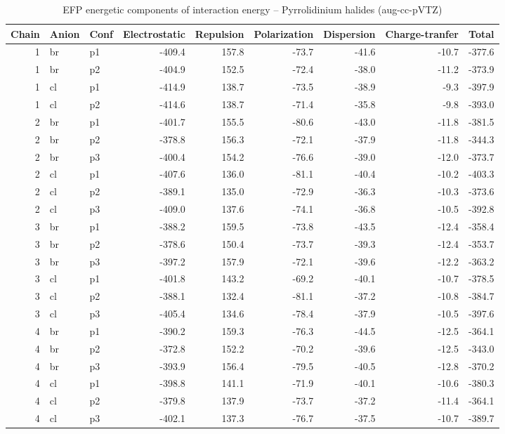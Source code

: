 \documentclass[a4paper]{article}
\begin{document}
\begin{table}[ht]
\centering
\footnotesize
\caption{EFP energetic components of interaction energy -- Pyrrolidinium halides (aug-cc-pVTZ)}
\begin{tabular}{rllrrrrrr}
  \hline
Chain & Anion & Conf & Electrostatic & Repulsion & Polarization & Dispersion & Charge-tranfer & Total \\ 
  \hline
 1 & br & p1 & -409.4 & 157.8 & -73.7 & -41.6 & -10.7 & -377.6 \\ 
   1 & br & p2 & -404.9 & 152.5 & -72.4 & -38.0 & -11.2 & -373.9 \\ 
   1 & cl & p1 & -414.9 & 138.7 & -73.5 & -38.9 & -9.3 & -397.9 \\ 
   1 & cl & p2 & -414.6 & 138.7 & -71.4 & -35.8 & -9.8 & -393.0 \\ 
   2 & br & p1 & -401.7 & 155.5 & -80.6 & -43.0 & -11.8 & -381.5 \\ 
   2 & br & p2 & -378.8 & 156.3 & -72.1 & -37.9 & -11.8 & -344.3 \\ 
   2 & br & p3 & -400.4 & 154.2 & -76.6 & -39.0 & -12.0 & -373.7 \\ 
   2 & cl & p1 & -407.6 & 136.0 & -81.1 & -40.4 & -10.2 & -403.3 \\ 
   2 & cl & p2 & -389.1 & 135.0 & -72.9 & -36.3 & -10.3 & -373.6 \\ 
   2 & cl & p3 & -409.0 & 137.6 & -74.1 & -36.8 & -10.5 & -392.8 \\ 
   3 & br & p1 & -388.2 & 159.5 & -73.8 & -43.5 & -12.4 & -358.4 \\ 
   3 & br & p2 & -378.6 & 150.4 & -73.7 & -39.3 & -12.4 & -353.7 \\ 
   3 & br & p3 & -397.2 & 157.9 & -72.1 & -39.6 & -12.2 & -363.2 \\ 
   3 & cl & p1 & -401.8 & 143.2 & -69.2 & -40.1 & -10.7 & -378.5 \\ 
   3 & cl & p2 & -388.1 & 132.4 & -81.1 & -37.2 & -10.8 & -384.7 \\ 
   3 & cl & p3 & -405.4 & 134.6 & -78.4 & -37.9 & -10.5 & -397.6 \\ 
   4 & br & p1 & -390.2 & 159.3 & -76.3 & -44.5 & -12.5 & -364.1 \\ 
   4 & br & p2 & -372.8 & 152.2 & -70.2 & -39.6 & -12.5 & -343.0 \\ 
   4 & br & p3 & -393.9 & 156.4 & -79.5 & -40.5 & -12.8 & -370.2 \\ 
   4 & cl & p1 & -398.8 & 141.1 & -71.9 & -40.1 & -10.6 & -380.3 \\ 
   4 & cl & p2 & -379.8 & 137.9 & -73.7 & -37.2 & -11.4 & -364.1 \\ 
   4 & cl & p3 & -402.1 & 137.3 & -76.7 & -37.5 & -10.7 & -389.7 \\ 
   \hline
\end{tabular}
\end{table}
\end{document}
